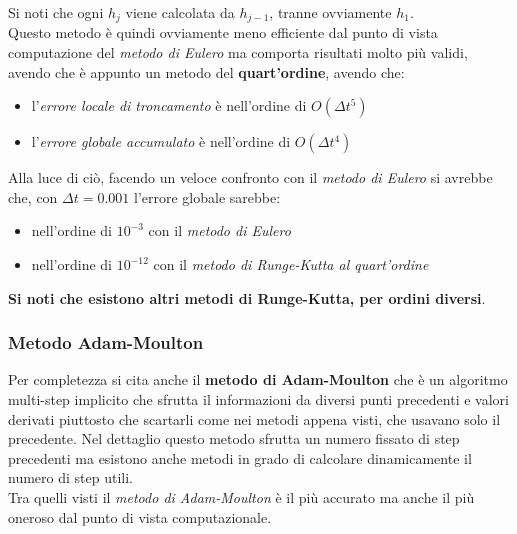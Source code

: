 \documentclass[a4paper,12pt, oneside]{book}
\begin{document}
Si noti che ogni $h_j$ viene calcolata da $h_{j-1}$, tranne ovviamente $h_1$.\\
Questo metodo è quindi ovviamente meno efficiente dal punto di vista
computazione del \textit{metodo di Eulero} ma comporta risultati molto più
validi, avendo che è appunto un metodo del \textbf{quart'ordine}, avendo che:
\begin{itemize}
  \item l'\textit{errore locale di troncamento} è nell'ordine di $O(\Delta t^5)$ 
  \item l'\textit{errore globale accumulato} è nell'ordine di $O(\Delta t^4)$ 
\end{itemize}
Alla luce di ciò, facendo un veloce confronto con il \textit{metodo di Eulero}
si avrebbe che, con $\Delta t = 0.001$ l'errore globale sarebbe:
\begin{itemize}
  \item nell'ordine di $10^{-3}$ con il \textit{metodo di Eulero}
  \item nell'ordine di $10^{-12}$ con il \textit{metodo di Runge-Kutta al
    quart'ordine}
\end{itemize}
\textbf{Si noti che esistono altri metodi di Runge-Kutta, per ordini diversi}.
\subsubsection{Metodo Adam-Moulton}
Per completezza si cita anche il \textbf{metodo di Adam-Moulton} che è un
algoritmo multi-step implicito che sfrutta il 
informazioni da diversi punti precedenti e valori derivati piuttosto che
scartarli come nei metodi appena visti, che usavano solo il precedente. Nel
dettaglio questo metodo sfrutta un numero fissato di step precedenti ma esistono
anche metodi in grado di calcolare dinamicamente il numero di step utili.\\
Tra quelli visti il \textit{metodo di Adam-Moulton} è il più accurato ma anche
il più oneroso dal punto di vista computazionale.
\end{document}
